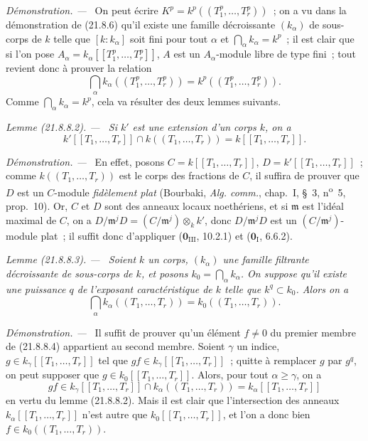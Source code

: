 \documentclass[10pt,oneside]{book}
\makeatletter
\newcommand{\setmanualcurrentlabel}[1]{\def\@currentlabel{#1}}
\newcommand{\oldpage}[2][]{%
  \setcounter{footnote}{0}%
  \marginpar{\scriptsize\textbf{#1}~|~#2}\ignorespaces}
\newenvironment{lemma}[1][]{%
  \setmanualcurrentlabel{#1}\par\medskip\noindent\itshape Lemme (#1). ---\ }{\par}
\newenvironment{proof}{%
  \par\medskip\noindent\textit{Démonstration. ---\ }}{\par}
\makeatother
\begin{document}
\begin{proof}
On peut écrire $K^p=k^p((T_1^p,\ldots,T_r^p))$~; on a vu dans la démonstration
de (21.8.6) qu'il existe une famille décroissante $(k_\alpha)$ de sous-corps
de $k$ telle que $[k:k_\alpha]$ soit fini pour tout $\alpha$ et
$\bigcap_\alpha k_\alpha=k^p$~; il est clair que si l'on pose
$A_\alpha=k_\alpha[[T_1^p,\ldots,T_r^p]]$, $A$ est un $A_\alpha$-module
libre de type fini~; tout revient donc à prouver la relation
\begin{equation}
\tag{21.8.8.1}
\label{0.21.8.8.1-fr}
  \bigcap_\alpha k_\alpha((T_1^p,\ldots,T_r^p))
  =k^p((T_1^p,\ldots,T_r^p)).
\end{equation}
Comme $\bigcap_\alpha k_\alpha=k^p$, cela va résulter des deux lemmes suivants.
\end{proof}

\begin{lemma}[21.8.8.2]
\label{0.21.8.8.2-fr}
Si $k'$ est une extension d'un corps $k$, on a
\[
  k'[[T_1,\ldots,T_r]]\cap k((T_1,\ldots,T_r))=k[[T_1,\ldots,T_r]].
\]
\end{lemma}

\begin{proof}
En effet, posons $C=k[[T_1,\ldots,T_r]]$, $D=k'[[T_1,\ldots,T_r]]$~; comme
$k((T_1,\ldots,T_r))$ est le corps des fractions de $C$, il suffira de
prouver que $D$ est un $C$-module \emph{fidèlement plat} (Bourbaki,
\emph{Alg. comm.}, chap.~I, \S~3, n\textsuperscript{o}~5, prop.~10). Or, $C$
et $D$ sont des anneaux locaux noethériens, et si $\mathfrak m$ est l'idéal
maximal de $C$, on a
$D/\mathfrak m^jD=(C/\mathfrak m^j)\otimes_k k'$, donc
$D/\mathfrak m^jD$ est un $(C/\mathfrak m^j)$-module plat~; il suffit donc
d'appliquer ($\mathbf 0_{\mathrm{III}}$, 10.2.1) et
($\mathbf 0_{\mathrm I}$, 6.6.2).
\end{proof}

\begin{lemma}[21.8.8.3]
\label{0.21.8.8.3-fr}
Soient $k$ un corps, $(k_\alpha)$ une famille filtrante décroissante de
sous-corps de $k$, et posons $k_0=\bigcap_\alpha k_\alpha$. On suppose qu'il
existe une puissance $q$ de l'exposant caractéristique de $k$ telle que
$k^q\subset k_0$. Alors on a
\begin{equation}
\tag{21.8.8.4}
\label{0.21.8.8.4-fr}
  \bigcap_\alpha k_\alpha((T_1,\ldots,T_r))=k_0((T_1,\ldots,T_r)).
\end{equation}
\end{lemma}

\begin{proof}
\oldpage[0\textsubscript{IV-1}]{176}
Il suffit de prouver qu'un élément $f\ne0$ du premier membre de (21.8.8.4)
appartient au second membre. Soient $\gamma$ un indice,
$g\in k_\gamma[[T_1,\ldots,T_r]]$ tel que
$gf\in k_\gamma[[T_1,\ldots,T_r]]$~; quitte à remplacer $g$ par $g^q$, on
peut supposer que $g\in k_0[[T_1,\ldots,T_r]]$. Alors, pour tout
$\alpha\geqslant\gamma$, on a
\[
  gf\in k_\gamma[[T_1,\ldots,T_r]]\cap k_\alpha((T_1,\ldots,T_r))
  =k_\alpha[[T_1,\ldots,T_r]]
\]
en vertu du lemme (21.8.8.2). Mais il est clair que l'intersection des
anneaux $k_\alpha[[T_1,\ldots,T_r]]$ n'est autre que
$k_0[[T_1,\ldots,T_r]]$, et l'on a donc bien
$f\in k_0((T_1,\ldots,T_r))$.
\end{proof}
\end{document}
